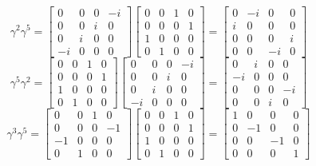 \documentclass{styles/kaobook}
\begin{document}
$$
\gamma^{2} \gamma^{5}=\begin{bmatrix}
0 & 0 & 0 & -i \\
0 & 0 & i & 0 \\
0 & i & 0 & 0 \\
-i & 0 & 0 & 0
\end{bmatrix}\begin{bmatrix}
0 & 0 & 1 & 0 \\
0 & 0 & 0 & 1 \\
1 & 0 & 0 & 0 \\
0 & 1 & 0 & 0
\end{bmatrix}=\begin{bmatrix}
0 & -i & 0 & 0 \\
i & 0 & 0 & 0 \\
0 & 0 & 0 & i \\
0 & 0 & -i & 0
\end{bmatrix}
$$
$$
\gamma^{5} \gamma^{2}=\begin{bmatrix}
0 & 0 & 1 & 0 \\
0 & 0 & 0 & 1 \\
1 & 0 & 0 & 0 \\
0 & 1 & 0 & 0
\end{bmatrix}\begin{bmatrix}
0 & 0 & 0 & -i \\
0 & 0 & i & 0 \\
0 & i & 0 & 0 \\
-i & 0 & 0 & 0
\end{bmatrix}=\begin{bmatrix}
0 & i & 0 & 0 \\
-i & 0 & 0 & 0 \\
0 & 0 & 0 & -i \\
0 & 0 & i & 0
\end{bmatrix}
$$
$$
\gamma^{3} \gamma^{5}=\begin{bmatrix}
0 & 0 & 1 & 0 \\
0 & 0 & 0 & -1 \\
-1 & 0 & 0 & 0 \\
0 & 1 & 0 & 0
\end{bmatrix}\begin{bmatrix}
0 & 0 & 1 & 0 \\
0 & 0 & 0 & 1 \\
1 & 0 & 0 & 0 \\
0 & 1 & 0 & 0
\end{bmatrix}=\begin{bmatrix}
1 & 0 & 0 & 0 \\
0 & -1 & 0 & 0 \\
0 & 0 & -1 & 0 \\
0 & 0 & 0 & 1
\end{bmatrix}
$$
\end{document}
